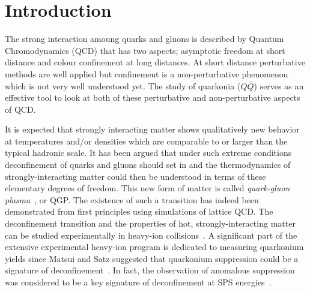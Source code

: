 \section{Introduction}
\label{sec:Introduction}


The strong interaction amoung quarks and gluons is described by
Quantum Chromodynamics (QCD) that has two aspects; asymptotic freedom at short distance
and colour confinement at long distances.
At short distance perturbative methods are well applied but confinement is a
non-perturbative phenomenon which is not very well understood yet. 
The study of quarkonia ($Q\bar{Q}$) serves as an effective 
tool to look at  both of these perturbative and non-perturbative aspects of QCD.

It is expected that strongly interacting matter shows qualitatively
new behavior at temperatures and/or densities which are
comparable to or larger than the typical hadronic scale.
It has been argued that under such extreme conditions
deconfinement of quarks and gluons should set in and the 
thermodynamics of strongly-interacting matter could then
be understood in terms of these elementary degrees of freedom.
This new form of matter is called
{\em quark-gluon plasma}~\cite{Shuryak:1980tp,Satz:2011wf}, or QGP.
The existence of such a transition has indeed been demonstrated 
from first principles using simulations of lattice QCD.
The deconfinement transition and the properties of hot, strongly-interacting 
matter can be studied experimentally in heavy-ion collisions~\cite{Satz:2000bn}. 
A significant part of the extensive experimental heavy-ion
program is dedicated to measuring quarkonium yields since Matsui and Satz
suggested that quarkonium suppression could be a signature of 
deconfinement~\cite{Matsui:1986dk}.
In fact, the observation of anomalous suppression was considered to be
a key signature of deconfinement at SPS energies~\cite{Kluberg:2005yh}.

